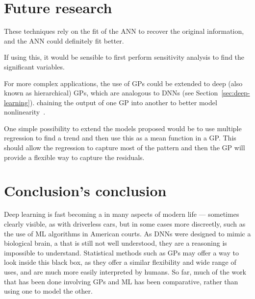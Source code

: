 \section{Future research}

These techniques rely on the fit of the \ac{ANN} to recover the original information, and the \ac{ANN} could definitely fit better.

If using this, it would be sensible to first perform sensitivity analysis to find the significant variables.

For more complex applications, the use of \acp{GP} could be extended to deep (also known as hierarchical) \acp{GP}, which are analogous to \acp{DNN} (see Section~\ref{sec:deep-learning}).
 chaining the output of one \ac{GP} into another to better model nonlinearity~\autocite{damianou2013}.

One simple possibility to extend the models proposed would be to use multiple regression to find a trend and then use this as a mean function in a \ac{GP}.
This should allow the regression to capture most of the pattern and then the \ac{GP} will provide a flexible way to capture the residuals.

\section{Conclusion's conclusion}

Deep learning is fast becoming a  in many aspects of modern life --- sometimes clearly visible, as with driverless cars, but in some cases more discreetly, such as the use of \ac{ML} algorithms in American courts.
As \acp{DNN} were designed to mimic a biological brain, a  that is still not well understood, they are a   reasoning is impossible to understand.
Statistical methods such as \acp{GP} may offer a way to look inside this black box, as they offer a similar flexibility and wide range of uses, and are much more easily interpreted by humans.
So far, much of the work that has been done involving \acp{GP} and \ac{ML} has been comparative, rather than using one to model the other.
